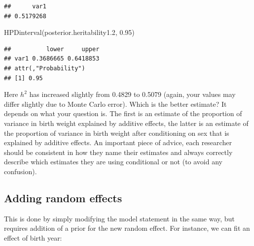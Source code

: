 \documentclass[
  12pt,
]{book}
\newenvironment{Shaded}{\begin{snugshade}}{\end{snugshade}}
\newcommand{\FloatTok}[1]{\textcolor[rgb]{0.00,0.00,0.81}{#1}}
\newcommand{\FunctionTok}[1]{\textcolor[rgb]{0.00,0.00,0.00}{#1}}
\newcommand{\NormalTok}[1]{#1}
\newcommand{\OtherTok}[1]{\textcolor[rgb]{0.56,0.35,0.01}{#1}}
\newcommand{\SpecialCharTok}[1]{\textcolor[rgb]{0.00,0.00,0.00}{#1}}
\newcommand{\StringTok}[1]{\textcolor[rgb]{0.31,0.60,0.02}{#1}}
\begin{document}
\begin{Shaded}
\end{Shaded}

\begin{verbatim}
##      var1 
## 0.5179268
\end{verbatim}

\begin{Shaded}
\begin{Highlighting}[]
\FunctionTok{HPDinterval}\NormalTok{(posterior.heritability1}\FloatTok{.2}\NormalTok{, }\FloatTok{0.95}\NormalTok{)}
\end{Highlighting}
\end{Shaded}

\begin{verbatim}
##          lower     upper
## var1 0.3686665 0.6418853
## attr(,"Probability")
## [1] 0.95
\end{verbatim}

Here \(h^2\) has increased slightly from 0.4829 to 0.5079 (again, your values may differ slightly due to Monte Carlo error). Which is the better estimate?
It depends on what your question is. The first is an estimate of the proportion of variance in birth weight explained by additive effects, the latter is an estimate of the proportion of variance in birth weight after conditioning on sex that is explained by additive effects.
An important piece of advice, each researcher should be consistent in how they name their estimates and always correctly describe which estimates they are using conditional or not (to avoid any confusion).

\hypertarget{adding-random-effects-1}{%
\subsection{Adding random effects}\label{adding-random-effects-1}}

This is done by simply modifying the model statement in the same way, but requires addition of a prior for the new random effect. For instance, we can fit an effect of birth year:
\end{document}
